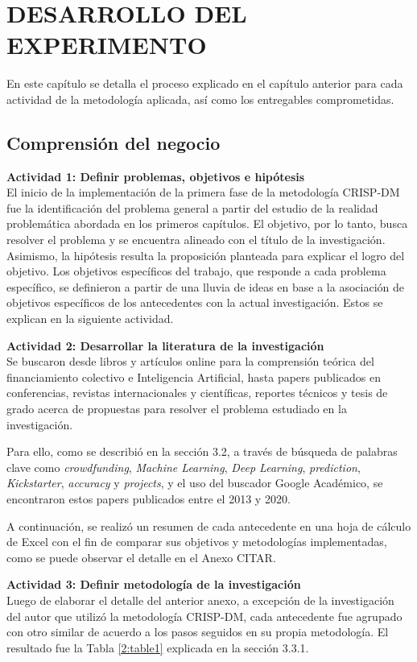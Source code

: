 \chapter{DESARROLLO DEL EXPERIMENTO}
En este capítulo se detalla el proceso explicado en el capítulo anterior para cada actividad de la metodología aplicada, así como los entregables comprometidas.

\section{Comprensión del negocio}
\textbf{Actividad 1: Definir problemas, objetivos e hipótesis}
\\
El inicio de la implementación de la primera fase de la metodología CRISP-DM fue la identificación del problema general a partir del estudio de la realidad problemática abordada en los primeros capítulos. El objetivo, por lo tanto, busca resolver el problema y se encuentra alineado con el título de la investigación. Asimismo, la hipótesis resulta la proposición planteada para explicar el logro del objetivo. Los objetivos específicos del trabajo, que responde a cada problema específico, se definieron a partir de una lluvia de ideas en base a la asociación de objetivos específicos de los antecedentes con la actual investigación. Estos se explican en la siguiente actividad.

\textbf{Actividad 2: Desarrollar la literatura de la investigación}
\\
Se buscaron desde libros y artículos online para la comprensión teórica del financiamiento colectivo e Inteligencia Artificial, hasta papers publicados en conferencias, revistas internacionales y científicas, reportes técnicos y tesis de grado acerca de propuestas para resolver el problema estudiado en la investigación.

Para ello, como se describió en la sección 3.2, a través de búsqueda de palabras clave como \textit{crowdfunding}, \textit{Machine Learning}, \textit{Deep Learning}, \textit{prediction}, \textit{Kickstarter}, \textit{accuracy} y \textit{projects}, y el uso del buscador Google Académico, se encontraron estos papers publicados entre el 2013 y 2020.

A continuación, se realizó un resumen de cada antecedente en una hoja de cálculo de Excel con el fin de comparar sus objetivos y metodologías implementadas, como se puede observar el detalle en el Anexo CITAR.

\textbf{Actividad 3: Definir metodología de la investigación}
\\
Luego de elaborar el detalle del anterior anexo, a excepción de la investigación del autor \cite{pr_fernandezblanco2020crowdfunding_empirical} que utilizó la metodología CRISP-DM, cada antecedente fue agrupado con otro similar de acuerdo a los pasos seguidos en su propia metodología. El resultado fue la Tabla \ref{2:table1} explicada en la sección 3.3.1.

